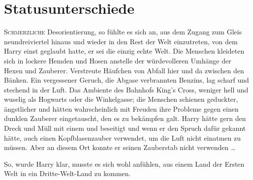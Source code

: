 \chapter{Statusunterschiede}

\lettrine{S}{chmerzliche} Desorientierung, so fühlte es sich an, aus dem Zugang zum Gleis neundreiviertel hinaus und wieder in den Rest der Welt einzutreten, von dem Harry einst geglaubt hatte, er sei die einzig echte Welt. Die Menschen kleideten sich in lockere Hemden und Hosen anstelle der würdevolleren Umhänge der Hexen und Zauberer. Verstreute Häufchen von Abfall hier und da zwischen den Bänken. Ein vergessener Geruch, die Abgase verbrannten Benzins, lag scharf und stechend in der Luft. Das Ambiente des Bahnhofs King’s Cross, weniger hell und wuselig als Hogwarts oder die Winkelgasse; die Menschen schienen geduckter, ängstlicher und hätten wahrscheinlich mit Freuden ihre Probleme gegen einen dunklen Zauberer eingetauscht, den es zu bekämpfen galt. Harry hätte gern den Dreck und Müll mit einem  und  beseitigt und wenn er den Spruch dafür gekannt hätte, auch einen Kopfblasenzauber verwendet, um die Luft nicht einatmen zu müssen. Aber an diesem Ort konnte er seinen Zauberstab nicht verwenden …

So, wurde Harry klar, musste es sich wohl anfühlen, aus einem Land der Ersten Welt in ein Dritte-Welt-Land zu kommen.

